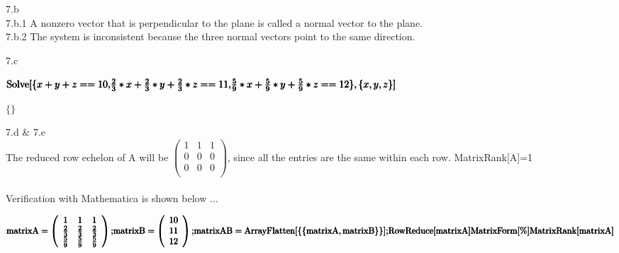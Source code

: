 \documentclass[11pt,a4paper]{article}
\begin{document}
7.b\\
7.b.1  A nonzero vector that is perpendicular to the plane is called a normal vector to the plane.\\
7.b.2 The system is inconsistent because the three normal vectors point to the same direction. 

7.c\\
\begin{doublespace}
\noindent\(\pmb{\text{Solve}[\{}\\
\pmb{x+y+z==10,}\\
\pmb{\frac{2}{3}*x+\frac{2}{3}*y+\frac{2}{3}*z==11,}\\
\pmb{\frac{5}{9}*x+\frac{5}{9}*y+\frac{5}{9}*z==12}\\
\pmb{\},\{x,y,z\}]}\)
\end{doublespace}

\begin{doublespace}
\noindent\(\{\}\)
\end{doublespace}

7.d $\&$ 7.e\\
The reduced row echelon of A will be \(\left(
\begin{array}{ccc}
 1 & 1 & 1 \\
 0 & 0 & 0 \\
 0 & 0 & 0 \\
\end{array}
\right)\), since all the entries are the same within each row. MatrixRank[A]=1\\
\\
Verification with Mathematica is shown below ...

\begin{doublespace}
\noindent\(\pmb{\text{matrixA}=\left(
\begin{array}{ccc}
 1 & 1 & 1 \\
 \frac{2}{3} & \frac{2}{3} & \frac{2}{3} \\
 \frac{5}{9} & \frac{5}{9} & \frac{5}{9} \\
\end{array}
\right);}\\
\pmb{\text{matrixB}=\left(
\begin{array}{c}
 10 \\
 11 \\
 12 \\
\end{array}
\right);}\\
\pmb{\text{matrixAB}=\text{ArrayFlatten}[\{\{\text{matrixA},\text{matrixB}\}\}];}\\
\pmb{\text{RowReduce}[\text{matrixA}]}\\
\pmb{\text{MatrixForm}[\%]}\\
\pmb{\text{MatrixRank}[\text{matrixA}]}\)
\end{doublespace}
\end{document}
